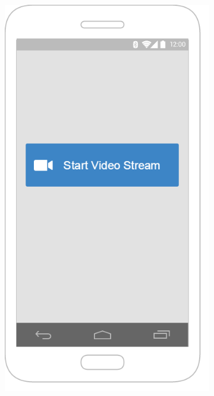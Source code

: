 \documentclass{article}
\begin{document}
	\begin{figure}
\centering
\begin{subfigure}{.5\textwidth}
  \centering
  \includegraphics[width=.9\linewidth]{"VideoStream/4"}
  

\end{subfigure}
\end{figure}
\end{document}
